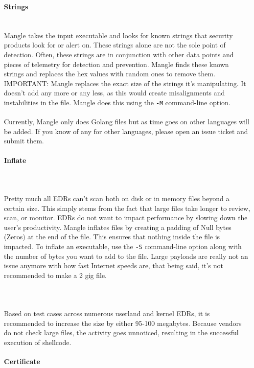 \documentclass{article}
\begin{document}
{\noindent \LARGE \textbf{Strings}}\\\\
\\
Mangle takes the input executable and looks for known strings that security products look for or alert on. These strings alone are not the sole point of detection. Often, these strings are in conjunction with other data points and pieces of telemetry for detection and prevention. Mangle finds these known strings and replaces the hex values with random ones to remove them. IMPORTANT: Mangle replaces the exact size of the strings it’s manipulating. It doesn’t add any more or any less, as this would create misalignments and instabilities in the file. Mangle does this using the \verb|-M| command-line option.\\
\\
Currently, Mangle only does Golang files but as time goes on other languages will be added. If you know of any for other languages, please open an issue ticket and submit them.\\
\\
{\noindent \LARGE \textbf{Inflate}}\\\\
\\
\\
Pretty much all EDRs can’t scan both on disk or in memory files beyond a certain size. This simply stems from the fact that large files take longer to review, scan, or monitor. EDRs do not want to impact performance by slowing down the user's productivity. Mangle inflates files by creating a padding of Null bytes (Zeros) at the end of the file. This ensures that nothing inside the file is impacted. To inflate an executable, use the \verb|-S| command-line option along with the number of bytes you want to add to the file. Large payloads are really not an issue anymore with how fast Internet speeds are, that being said, it's not recommended to make a 2 gig file.\\
\\
\\
\\
Based on test cases across numerous userland and kernel EDRs, it is recommended to increase the size by either 95-100 megabytes. Because vendors do not check large files, the activity goes unnoticed, resulting in the successful execution of shellcode.\\
\\
{\noindent \LARGE \textbf{Certificate}}\\\\
\end{document}
